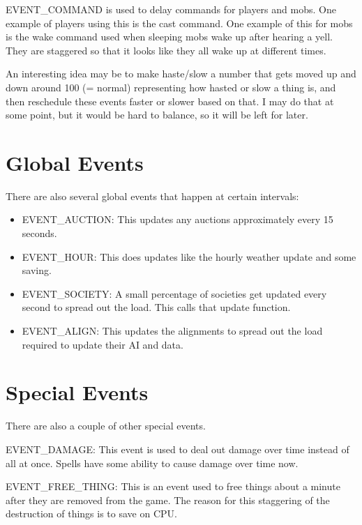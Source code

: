 EVENT\_COMMAND is used to delay commands for players and mobs. One
example of players using this is the cast command. One example of
this for mobs is the wake command used when sleeping mobs wake up
after hearing a yell. They are staggered so that it looks like they
all wake up at different times.

An interesting idea may be to make haste/slow a number that gets
moved up and down around 100 (= normal) representing how hasted or
slow a thing is, and then reschedule these events faster or slower
based on that. I may do that at some point, but it would be hard to
balance, so it will be left for later.

\section{Global Events}
There are also several global events that happen at certain
intervals:

\begin{itemize}


\item EVENT\_AUCTION: This updates any auctions approximately every 15
seconds.

\item EVENT\_HOUR: This does updates like the hourly weather update
and some saving.

\item EVENT\_SOCIETY: A small percentage of societies get updated
every second to spread out the load. This calls that update function.

\item EVENT\_ALIGN: This updates the alignments to spread out the load
required to update their AI and data.


\end{itemize}

\section{Special Events}

There are also a couple of other special events.

EVENT\_DAMAGE: This event is used to deal out damage over time instead
of all at once. Spells have some ability to cause damage over time
now.

EVENT\_FREE\_THING: This is an event used to free things about a minute
after they are removed from the game. The reason for this staggering
of the destruction of things is to save on CPU. 

